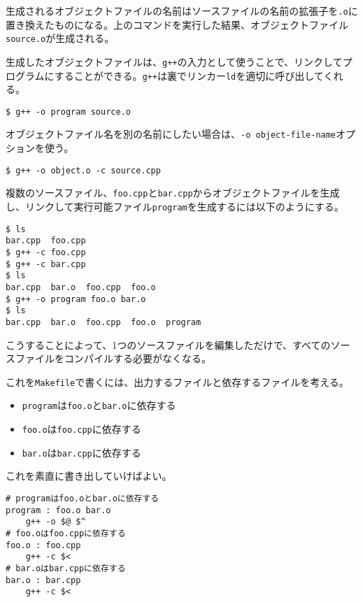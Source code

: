 生成されるオブジェクトファイルの名前はソースファイルの名前の拡張子を\texttt{.o}に置き換えたものになる。上のコマンドを実行した結果、オブジェクトファイル\texttt{source.o}が生成される。

生成したオブジェクトファイルは、\texttt{g++}の入力として使うことで、リンクしてプログラムにすることができる。\texttt{g++}は裏でリンカー\texttt{ld}を適切に呼び出してくれる。

\begin{lstlisting}[style=terminal]
$ g++ -o program source.o
\end{lstlisting}

オブジェクトファイル名を別の名前にしたい場合は、\texttt{-o object-file-name}オプションを使う。

\begin{lstlisting}[style=terminal]
$ g++ -o object.o -c source.cpp
\end{lstlisting}

複数のソースファイル、\texttt{foo.cpp}と\texttt{bar.cpp}からオブジェクトファイルを生成し、リンクして実行可能ファイル\texttt{program}を生成するには以下のようにする。

\begin{lstlisting}[style=terminal]
$ ls
bar.cpp  foo.cpp
$ g++ -c foo.cpp
$ g++ -c bar.cpp
$ ls
bar.cpp  bar.o  foo.cpp  foo.o
$ g++ -o program foo.o bar.o
$ ls
bar.cpp  bar.o  foo.cpp  foo.o  program
\end{lstlisting}

こうすることによって、1つのソースファイルを編集しただけで、すべてのソースファイルをコンパイルする必要がなくなる。

これを\texttt{Makefile}で書くには、出力するファイルと依存するファイルを考える。

\begin{itemize}
\item
  \texttt{program}は\texttt{foo.o}と\texttt{bar.o}に依存する
\item
  \texttt{foo.o}は\texttt{foo.cpp}に依存する
\item
  \texttt{bar.o}は\texttt{bar.cpp}に依存する
\end{itemize}

これを素直に書き出していけばよい。

\begin{lstlisting}[style=terminal]
# programはfoo.oとbar.oに依存する
program : foo.o bar.o
    g++ -o $@ $^
# foo.oはfoo.cppに依存する
foo.o : foo.cpp
    g++ -c $<
# bar.oはbar.cppに依存する
bar.o : bar.cpp
    g++ -c $<
\end{lstlisting}

